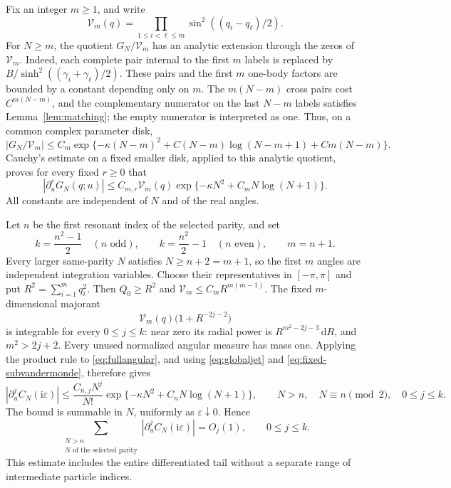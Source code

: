 \documentclass[11pt]{article}
\numberwithin{equation}{section}
\theoremstyle{definition}
\newcommand{\dd}{\,\mathrm d}
\newcommand{\ii}{\mathrm i}
\newcommand{\eps}{\varepsilon}
\begin{document}
Fix an integer $m\ge1$, and write
\[
 \mathcal V_m(q)=\prod_{1\le i<\ell\le m}
                   \sin^2((q_i-q_\ell)/2).
\]
For $N\ge m$, the quotient $G_N/\mathcal V_m$ has an analytic
extension through the zeros of $\mathcal V_m$. Indeed, each complete
pair internal to the first $m$ labels is replaced by
$B/\sinh^2((\gamma_i+\gamma_\ell)/2)$. These pairs and the first
$m$ one-body factors are bounded by a constant depending only on $m$.
The $m(N-m)$ cross pairs cost $C^{m(N-m)}$, and the complementary
numerator on the last $N-m$ labels satisfies
Lemma~\ref{lem:matching}; the empty numerator is interpreted as one.
Thus, on a common complex parameter disk,
\[
 \left|G_N/\mathcal V_m\right|
 \le C_m\exp\{-\kappa(N-m)^2
          +C(N-m)\log(N-m+1)+Cm(N-m)\}.
\]
Cauchy's estimate on a fixed smaller disk, applied to this analytic
quotient, proves for every fixed $r\ge0$ that
\begin{equation}\label{eq:fixed-subvandermonde}
 |\partial_u^rG_N(q;u)|
 \le C_{m,r}\mathcal V_m(q)
       \exp\{-\kappa N^2+C_mN\log(N+1)\}.
\end{equation}
All constants are independent of $N$ and of the real angles.

Let $n$ be the first resonant index of the selected parity, and set
\[
 k=\frac{n^2-1}{2}\quad(n\text{ odd}),\qquad
 k=\frac{n^2}{2}-1\quad(n\text{ even}),\qquad m=n+1.
\]
Every larger same-parity $N$ satisfies $N\ge n+2=m+1$, so the first
$m$ angles are independent integration variables. Choose their
representatives in $[-\pi,\pi]$ and put $R^2=\sum_{i=1}^m q_i^2$.
Then $Q_0\ge R^2$ and
$\mathcal V_m\le C_mR^{m(m-1)}$. The fixed $m$-dimensional
majorant
\[
 \mathcal V_m(q)\bigl(1+R^{-2j-2}\bigr)
\]
is integrable for every $0\le j\le k$: near zero its radial power is
$R^{m^2-2j-3}\dd R$, and $m^2>2j+2$. Every unused normalized
angular measure has mass one. Applying the product rule to
\eqref{eq:fullangular}, and using \eqref{eq:globaljet} and
\eqref{eq:fixed-subvandermonde}, therefore gives
\begin{equation}\label{eq:hightail}
 |\partial_u^jC_N(\ii\eps)|
 \le\frac{C_{n,j}N^j}{N!}
      \exp\{-\kappa N^2+C_nN\log(N+1)\},
 \qquad N>n,\quad N\equiv n\pmod2,
 \quad0\le j\le k.
\end{equation}
The bound is summable in $N$, uniformly as $\eps\downarrow0$. Hence
\begin{equation}\label{eq:alltail}
 \sum_{\substack{N>n\\N\text{ of the selected parity}}}
 |\partial_u^jC_N(\ii\eps)|=O_j(1),\qquad0\le j\le k.
\end{equation}
This estimate includes the entire differentiated tail without a
separate range of intermediate particle indices.
\end{document}
